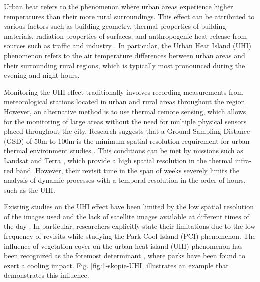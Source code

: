     Urban heat refers to the phenomenon where urban areas experience higher temperatures than their more rural surroundings.
    This effect can be attributed to various factors such as building geometry, thermal properties of building materials, radiation properties of surfaces, and anthropogenic heat release from sources such as traffic and industry \cite{deilami2018urban}. 
    In particular,  the Urban Heat Island (UHI) phenomenon refers to the air temperature differences between urban areas and their surrounding rural regions, which is typically most pronounced during the evening and night hours. 

    Monitoring the UHI effect traditionally involves recording measurements from meteorological stations located in urban and rural areas throughout the region.
    However, an alternative method is to use thermal remote sensing, which allows for the monitoring of large areas without the need for multiple physical sensors placed throughout the city.
    Research suggests that a Ground Sampling Distance (GSD) of 50m to 100m is the minimum spatial resolution requirement for urban thermal environment studies \cite{mohamed2017land, sobrino2012impact, huang2013generating}. 
    This conditions can be met by missions such as Landsat \cite{USGS2023Landsat} and Terra \cite{terra_nasa}, which provide a high spatial resolution in the thermal infra-red band.
    However, their revisit time in the span of weeks severely limits the analysis of dynamic processes with a temporal resolution in the order of hours, such as the UHI. 

    Existing studies on the UHI effect have been limited by the low spatial resolution of the images used and the lack of satellite images available at different times of the day \cite{Zhu2021, Shi2019}. 
    In particular, researchers explicitly state their limitations \cite{Shi2019} due to the low frequency of revisits while studying the Park Cool Island (PCI) \cite{Yang2017} phenomenon. 
    The influence of vegetation cover on the urban heat island (UHI) phenomenon has been recognized as the foremost determinant \cite{deilami2018urban}, where parks have been found to exert a cooling impact.
    Fig. \ref{fig:1-skopie-UHI} illustrates an example that demonstrates this influence. 
    
